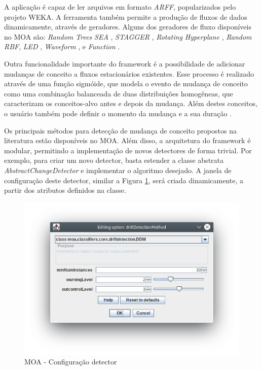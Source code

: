 \documentclass[qual, classic, a4paper]{ufbathesis}
\begin{document}
A aplicação é capaz de ler arquivos em formato \textit{ARFF}, popularizados pelo projeto WEKA.
A ferramenta também permite a produção de fluxos de dados dinamicamente, através de geradores.
Alguns dos geradores de fluxo disponíveis no MOA são:
\textit{Random Trees} \cite{Domingos:2000:MHD:347090.347107}
\textit{SEA} \cite{Street:2001:SEA:502512.502568}, 
\textit{STAGGER} \cite{Schlimmer1986}, 
\textit{Rotating Hyperplane} \cite{Wang:2003:MCD:956750.956778},
\textit{Random RBF}, 
\textit{LED} \cite{Gama:2003:ADT:956750.956813}, 
\textit{Waveform} \cite{Gama:2003:ADT:956750.956813}, 
 e \textit{Function} \cite{Jin:2003:EDT:956750.956821}.

Outra funcionalidade importante do framework é a possibilidade de adicionar mudanças de conceito a fluxos estacionários existentes.
Esse processo é realizado através de uma função sigmóide, que modela o evento de mudança de conceito como uma combinação balanceada de duas distribuições homogêneas, 
que caracterizam os conceitos-alvo antes e depois da mudança.
Além destes conceitos, o usuário também pode definir o momento da mudança e a sua duração \cite{Bifet:2010:MMO:1756006.1859903}.

Os principais métodos para detecção de mudança de conceito propostos na literatura estão disponíveis no MOA.
Além disso, a arquitetura do framework é modular, permitindo a implementação de novos detectores de forma trivial.
Por exemplo, para criar um novo detector, basta estender a classe abstrata \textit{AbstractChangeDetector} e implementar o algoritmo desejado.
A janela de configuração deste detector, similar a Figura \ref{fig:moa_detector}, será criada dinamicamente, a partir dos atributos definidos na classe.

\begin{figure}[H]
\begin{center}
    \includegraphics[scale=1]{imagens/detector.png}
    \caption{MOA - Configuração detector}
    \label{fig:moa_detector}
\end{center}
\end{figure}
    
\end{document}
